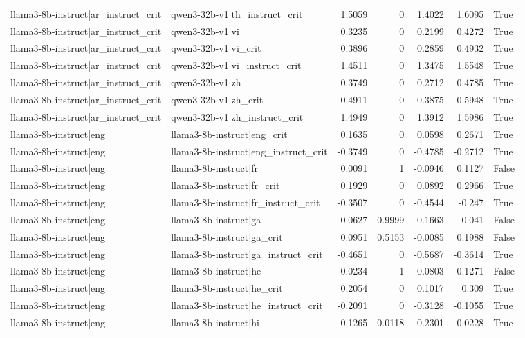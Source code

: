 \begin{table}
\begin{tabular}{l l r r r r l}
llama3-8b-instruct|ar_instruct_crit & qwen3-32b-v1|th_instruct_crit & 1.5059 & 0 & 1.4022 & 1.6095 & True \\
llama3-8b-instruct|ar_instruct_crit & qwen3-32b-v1|vi & 0.3235 & 0 & 0.2199 & 0.4272 & True \\
llama3-8b-instruct|ar_instruct_crit & qwen3-32b-v1|vi_crit & 0.3896 & 0 & 0.2859 & 0.4932 & True \\
llama3-8b-instruct|ar_instruct_crit & qwen3-32b-v1|vi_instruct_crit & 1.4511 & 0 & 1.3475 & 1.5548 & True \\
llama3-8b-instruct|ar_instruct_crit & qwen3-32b-v1|zh & 0.3749 & 0 & 0.2712 & 0.4785 & True \\
llama3-8b-instruct|ar_instruct_crit & qwen3-32b-v1|zh_crit & 0.4911 & 0 & 0.3875 & 0.5948 & True \\
llama3-8b-instruct|ar_instruct_crit & qwen3-32b-v1|zh_instruct_crit & 1.4949 & 0 & 1.3912 & 1.5986 & True \\
llama3-8b-instruct|eng & llama3-8b-instruct|eng_crit & 0.1635 & 0 & 0.0598 & 0.2671 & True \\
llama3-8b-instruct|eng & llama3-8b-instruct|eng_instruct_crit & -0.3749 & 0 & -0.4785 & -0.2712 & True \\
llama3-8b-instruct|eng & llama3-8b-instruct|fr & 0.0091 & 1 & -0.0946 & 0.1127 & False \\
llama3-8b-instruct|eng & llama3-8b-instruct|fr_crit & 0.1929 & 0 & 0.0892 & 0.2966 & True \\
llama3-8b-instruct|eng & llama3-8b-instruct|fr_instruct_crit & -0.3507 & 0 & -0.4544 & -0.247 & True \\
llama3-8b-instruct|eng & llama3-8b-instruct|ga & -0.0627 & 0.9999 & -0.1663 & 0.041 & False \\
llama3-8b-instruct|eng & llama3-8b-instruct|ga_crit & 0.0951 & 0.5153 & -0.0085 & 0.1988 & False \\
llama3-8b-instruct|eng & llama3-8b-instruct|ga_instruct_crit & -0.4651 & 0 & -0.5687 & -0.3614 & True \\
llama3-8b-instruct|eng & llama3-8b-instruct|he & 0.0234 & 1 & -0.0803 & 0.1271 & False \\
llama3-8b-instruct|eng & llama3-8b-instruct|he_crit & 0.2054 & 0 & 0.1017 & 0.309 & True \\
llama3-8b-instruct|eng & llama3-8b-instruct|he_instruct_crit & -0.2091 & 0 & -0.3128 & -0.1055 & True \\
llama3-8b-instruct|eng & llama3-8b-instruct|hi & -0.1265 & 0.0118 & -0.2301 & -0.0228 & True \\

\end{tabular}
\end{table}
